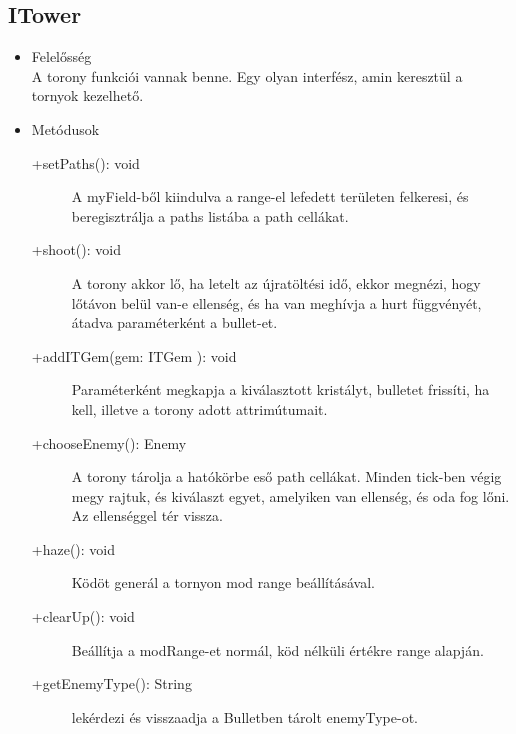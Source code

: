 \subsection{ITower}
\begin{itemize}
\item Felelősség\\
A torony funkciói vannak benne. Egy olyan interfész, amin keresztül a tornyok kezelhető.
\item Metódusok\\
	\begin{description}
		\item[+setPaths(): void] A myField-ből kiindulva a range-el lefedett területen felkeresi, és beregisztrálja a paths listába a path cellákat. 
\item[+shoot(): void] A torony akkor lő, ha letelt az újratöltési idő, ekkor megnézi, hogy lőtávon belül van-e ellenség, és ha van meghívja a hurt függvényét, átadva paraméterként a bullet-et. 
\item[+addITGem(gem: ITGem ): void] Paraméterként megkapja a kiválasztott kristályt, bulletet frissíti, ha kell, illetve a torony adott attrimútumait. 
\item[+chooseEnemy(): Enemy] A torony tárolja a hatókörbe eső path cellákat. Minden tick-ben végig megy rajtuk, és kiválaszt egyet, amelyiken van ellenség, és oda fog lőni. Az ellenséggel tér vissza. 
\item[+haze(): void] Ködöt generál a tornyon mod range beállításával. 
\item[+clearUp(): void] Beállítja a modRange-et normál, köd nélküli értékre range alapján. 
\item[+getEnemyType(): String] lekérdezi és visszaadja a Bulletben tárolt enemyType-ot.

		
		
	\end{description}
\end{itemize}
